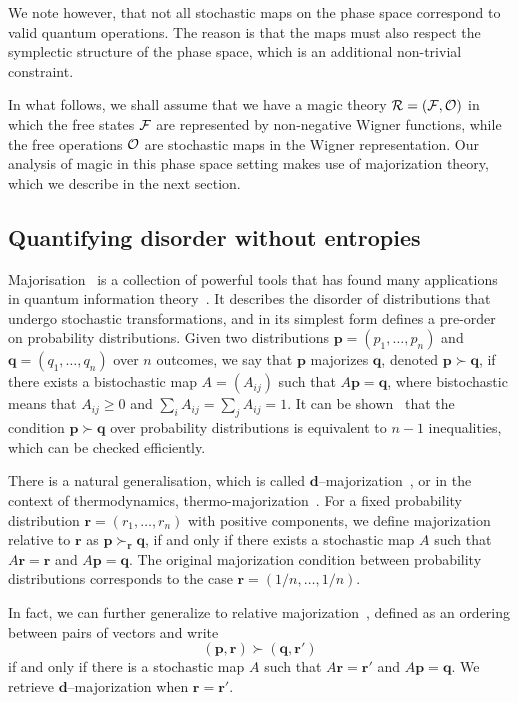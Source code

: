 \documentclass[
onecolumn,
superscriptaddress
]{revtex4-1}
\def\r{\boldsymbol{r}}
\def\p{\boldsymbol{p}}
\def\q{\boldsymbol{q}}
\def\d{\boldsymbol{d}}
\def\q{\boldsymbol{q}}
\def\R{{\cal R}}
\def\F{{\cal F}}
\renewcommand{\O}{{\cal O}}
\begin{document}
We note however, that not all stochastic maps on the phase space correspond to valid quantum operations. The reason is that the maps must also respect the symplectic structure of the phase space, which is an additional non-trivial constraint.

In what follows, we shall assume that we have a magic theory $\R = (\F, \O)$ in which the free states $\F$ are represented by non-negative Wigner functions, while the free operations $\O$ are stochastic maps in the Wigner representation. Our analysis of magic in this phase space setting makes use of majorization theory, which we describe in the next section.



\subsection*{Quantifying disorder without entropies}

Majorisation~\cite{cit:marshall, Blackwell_1953} is a collection of powerful tools that has found many applications in quantum information theory~\cite{Nielsen_1999, cit:cwiklinski, cit:lostaglio2, cit:gour, cit:gour2, Horodecki_2003, Puchala_2013, Vallejos_2021}.
It describes the disorder of distributions that undergo stochastic transformations, and in its simplest form defines a pre-order on probability distributions. Given two distributions $\p= (p_1, \dots, p_n)$ and $\q = (q_1, \dots, q_n)$ over $n$ outcomes, we say that $\p$ majorizes $\q$, denoted $\p \succ \q$, if there exists a bistochastic map $A = (A_{ij})$ such that $A\p = \q$, where bistochastic means that $A_{ij} \geq 0$ and $\sum_i A_{ij} = \sum_j A_{ij} = 1$. It can be shown~\cite{cit:marshall} that the condition $ \p \succ \q$ over probability distributions is equivalent to $n-1$ inequalities, which can be checked efficiently.

There is a natural generalisation, which is called $\d$--majorization~\cite{Veinott_1971}, or in the context of thermodynamics, thermo-majorization~\cite{cit:horodecki2013}. For a fixed probability distribution $\r = (r_1, \dots, r_n)$ with positive components, we define majorization relative to $\r$ as $\p \succ_{\r} \q$, if and only if there exists a stochastic map $A$ such that $A\r = \r$ and $A \p = \q$. The original majorization condition between probability distributions corresponds to the case $\r = (1/n, \dots, 1/n)$. 

In fact, we can further generalize to relative majorization~\cite{Blackwell_1953, Ruch_1976, ruch_mixing_1978, Renes_2016, Buscemi_2017, Rethinasamy_2020}, defined as an ordering between pairs of vectors and write 
\begin{equation}
	(\p,\r) \succ (\q, \r')
\end{equation}
if and only if there is a stochastic map $A$ such that $A\r = \r'$ and $A\p = \q$. We retrieve $\d$--majorization when $\r = \r'$.
\end{document}
